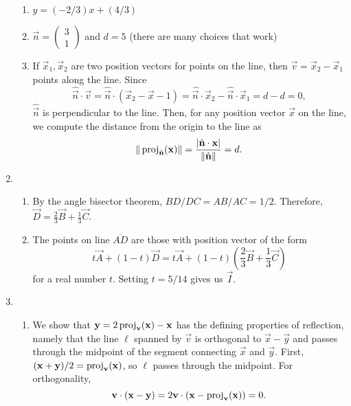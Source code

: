 \begin{enumerate}
\begin{enumerate}
\item $y = (-2/3)x + (4/3)$
\item $\vec{n} = \begin{pmatrix} 3 \\ 1 \end{pmatrix}$ and $d = 5$ (there are many choices that work)
\item If $\vec{x}_1,\vec{x}_2$ are two position vectors for points on the line, then $\vec{v} = \vec{x}_2 - \vec{x}_1$ points along the line. Since
\begin{equation*}
\hat{\vec{n}}\cdot\vec{v} = \hat{\vec{n}}\cdot (\vec{x}_2 - \vec{x}-1) = \hat{\vec{n}}\cdot\vec{x}_2 - \hat{\vec{n}}\cdot\vec{x}_1 = d - d = 0,
\end{equation*}
$\hat{\vec{n}}$ is perpendicular to the line. Then, for any position vector $\vec{x}$ on the line, we compute the distance from the origin to the line as
\begin{equation*}
\|\operatorname{proj}_{\hat{\mathbf{n}}}(\mathbf{x})\| = \frac{\lvert\hat{\mathbf{n}}\cdot\mathbf{x}\rvert}{\|\hat{\mathbf{n}}\|} = d.
\end{equation*}
\end{enumerate}
\item \begin{enumerate}
\item By the angle bisector theorem, $BD/DC = AB/AC = 1/2$. Therefore, $\vec{D} = \frac{2}{3}\vec{B} + \frac{1}{3}\vec{C}$.
\item The points on line $\overline{AD}$ are those with position vector of the form
\begin{equation*}
t\vec{A} + (1 - t)\vec{D} = t\vec{A} + (1 - t)\left(\frac{2}{3}\vec{B} + \frac{1}{3}\vec{C}\right)
\end{equation*}
for a real number $t$. Setting $t = 5/14$ gives us $\vec{I}$.
\end{enumerate}
\item \begin{enumerate}
\item We show that $\mathbf{y} = 2\operatorname{proj}_{\mathbf{v}}(\mathbf{x}) - \mathbf{x}$ has the defining properties of reflection, namely that the line $\ell$ spanned by $\vec{v}$ is orthogonal to $\vec{x} - \vec{y}$ and passes through the midpoint of the segment connecting $\vec{x}$ and $\vec{y}$. First, $(\mathbf{x} + \mathbf{y})/2 = \operatorname{proj}_{\mathbf{v}}(\mathbf{x})$, so $\ell$ passes through the midpoint. For orthogonality,
\begin{equation*}
\vec{v}\cdot (\vec{x} - \vec{y}) = 2\vec{v}\cdot (\vec{x} - \proj_{\vec{v}}(\vec{x})) = 0.

\end{equation*}
\end{enumerate}
\end{enumerate}
